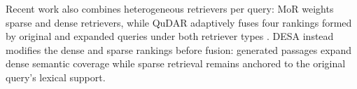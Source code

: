 Recent work also combines heterogeneous retrievers per query: MoR weights
sparse and dense retrievers, while QuDAR adaptively fuses four rankings formed
by original and expanded queries under both retriever types
\citep{kalra-etal-2025-mor,kim-etal-2026-qudar}. DESA instead modifies the dense
and sparse rankings before fusion: generated passages expand dense semantic
coverage while sparse retrieval remains anchored to the original query's
lexical support.
